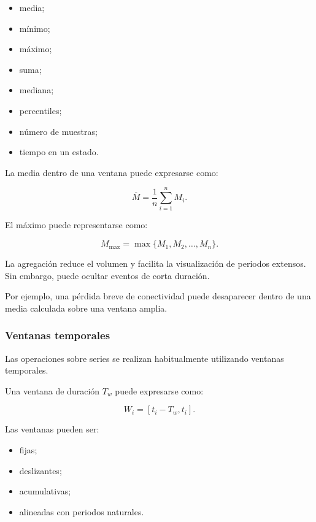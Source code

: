 \begin{itemize}
    \item media;

    \item mínimo;

    \item máximo;

    \item suma;

    \item mediana;

    \item percentiles;

    \item número de muestras;

    \item tiempo en un estado.
\end{itemize}

La media dentro de una ventana puede expresarse como:

\[
    \overline{M}
    =
    \frac{1}{n}
    \sum_{i=1}^{n}
    M_i.
\]

El máximo puede representarse como:

\[
    M_{\max}
    =
    \max
    \{
        M_1,
        M_2,
        \ldots,
        M_n
    \}.
\]

La agregación reduce el volumen y facilita la visualización de periodos
extensos. Sin embargo, puede ocultar eventos de corta duración.

Por ejemplo, una pérdida breve de conectividad puede desaparecer dentro
de una media calculada sobre una ventana amplia.


\subsubsection*{Ventanas temporales}

Las operaciones sobre series se realizan habitualmente utilizando
ventanas temporales.

Una ventana de duración \(T_w\) puede expresarse como:

\[
    W_i
    =
    [
        t_i-T_w,
        t_i
    ].
\]

Las ventanas pueden ser:

\begin{itemize}
    \item fijas;

    \item deslizantes;

    \item acumulativas;

    \item alineadas con periodos naturales.
\end{itemize}

